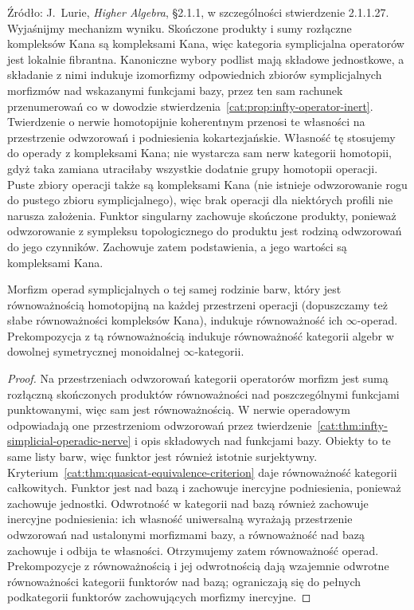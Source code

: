 Źródło: J.~Lurie, \emph{Higher Algebra}, \S2.1.1, w szczególności stwierdzenie 2.1.1.27. Wyjaśnijmy mechanizm wyniku. Skończone produkty i sumy rozłączne kompleksów Kana są kompleksami Kana, więc kategoria symplicjalna operatorów jest lokalnie fibrantna. Kanoniczne wybory podlist mają składowe jednostkowe, a składanie z nimi indukuje izomorfizmy odpowiednich zbiorów symplicjalnych morfizmów nad wskazanymi funkcjami bazy, przez ten sam rachunek przenumerowań co w dowodzie stwierdzenia~\ref{cat:prop:infty-operator-inert}. Twierdzenie o nerwie homotopijnie koherentnym przenosi te własności na przestrzenie odwzorowań i podniesienia kokartezjańskie. Własność tę stosujemy do operady z kompleksami Kana; nie wystarcza sam nerw kategorii homotopii, gdyż taka zamiana utraciłaby wszystkie dodatnie grupy homotopii operacji. Puste zbiory operacji także są kompleksami Kana (nie istnieje odwzorowanie rogu do pustego zbioru symplicjalnego), więc brak operacji dla niektórych profili nie narusza założenia. Funktor singularny zachowuje skończone produkty, ponieważ odwzorowanie z sympleksu topologicznego do produktu jest rodziną odwzorowań do jego czynników. Zachowuje zatem podstawienia, a jego wartości są kompleksami Kana.

\begin{stwierdzenie}\label{cat:prop:infty-operad-arity-equivalence}
Morfizm operad symplicjalnych o tej samej rodzinie barw, który jest równoważnością homotopijną na każdej przestrzeni operacji (dopuszczamy też słabe równoważności kompleksów Kana), indukuje równoważność ich $\infty$-operad. Prekompozycja z tą równoważnością indukuje równoważność kategorii algebr w dowolnej symetrycznej monoidalnej $\infty$-kategorii.
\end{stwierdzenie}
\begin{proof}
Na przestrzeniach odwzorowań kategorii operatorów morfizm jest sumą rozłączną skończonych produktów równoważności nad poszczególnymi funkcjami punktowanymi, więc sam jest równoważnością. W nerwie operadowym odpowiadają one przestrzeniom odwzorowań przez twierdzenie~\ref{cat:thm:infty-simplicial-operadic-nerve} i opis składowych nad funkcjami bazy. Obiekty to te same listy barw, więc funktor jest również istotnie surjektywny. Kryterium~\ref{cat:thm:quasicat-equivalence-criterion} daje równoważność kategorii całkowitych. Funktor jest nad bazą i zachowuje inercyjne podniesienia, ponieważ zachowuje jednostki. Odwrotność w kategorii nad bazą również zachowuje inercyjne podniesienia: ich własność uniwersalną wyrażają przestrzenie odwzorowań nad ustalonymi morfizmami bazy, a równoważność nad bazą zachowuje i odbija te własności. Otrzymujemy zatem równoważność operad. Prekompozycje z równoważnością i jej odwrotnością dają wzajemnie odwrotne równoważności kategorii funktorów nad bazą; ograniczają się do pełnych podkategorii funktorów zachowujących morfizmy inercyjne.
\end{proof}

